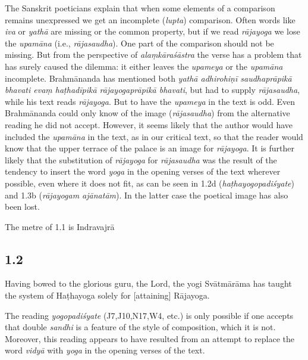 \begin{ekdosis}
\begin{philcomm}[hp01_001]
The Sanskrit poeticians explain that when some elements of a comparison remains unexpressed we get an incomplete (\emph{lupta}) comparison. Often words like \emph{iva} or \emph{yathā} are missing or the common property, but if we read \emph{rājayoga} we lose the \emph{upamāna} (i.e., \emph{rājasaudha}). One part of the comparison should not be missing. But from the perspective of \emph{alaṃkāraśāstra} the verse has a problem that has surely caused the dilemma: it either leaves the \emph{upameya} or the \emph{upamāna} incomplete. Brahmānanda has mentioned both \emph{yathā adhirohiṇī saudhaprāpikā bhavati evaṃ haṭhadīpikā rājayogaprāpikā bhavati}, but had to supply \emph{rājasaudha}, while his text reads \emph{rājayoga}. But to have the \emph{upameya} in the text is odd. Even Brahmānanda could only know of the image (\emph{rājasaudha}) from the alternative reading he did not accept. However, it seems likely that the author would have included the \emph{upamāna} in the text, as in our critical text, so that the reader would know that the upper terrace of the palace is an image for \emph{rājayoga}. It is further likely that the substitution of \emph{rājayoga} for \emph{rājasaudha} was the result of the tendency to insert the word \emph{yoga} in the opening verses of the text wherever possible, even where it does not fit, as can be seen in 1.2d (\emph{haṭhayogopadiśyate}) and 1.3b (\emph{rājayogam ajānatām}). In the latter case the poetical image has also been lost.

The metre of 1.1 is Indravajrā
\end{philcomm}

\subsection*{1.2}
\begin{translation}[hp01_002]
Having bowed to the glorious guru, the Lord, the yogi Svātmārāma has taught the system of Haṭhayoga solely for [attaining] Rājayoga.
\end{translation}

\begin{philcomm}[hp01_002]
The reading \emph{yogopadiśyate} (J7,J10,N17,W4, etc.) is only possible if one accepts that double \emph{sandhi} is a feature of the style of composition, which it is not. Moreover, this reading appears to have resulted from an attempt to replace the word \emph{vidyā} with \emph{yoga} in the opening verses of the text.
\end{philcomm}


\end{ekdosis}

